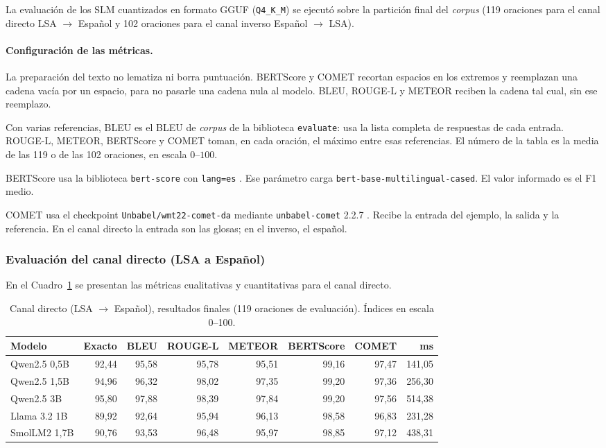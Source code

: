 La evaluación de los SLM cuantizados en formato GGUF (\texttt{Q4\_K\_M}) se ejecutó sobre la partición final del \textit{corpus} (119 oraciones para el canal directo LSA $\rightarrow$ Español y 102 oraciones para el canal inverso Español $\rightarrow$ LSA).

\paragraph{Configuración de las métricas.}
La preparación del texto no lematiza ni borra puntuación. BERTScore y COMET recortan espacios en los extremos y reemplazan una cadena vacía por un espacio, para no pasarle una cadena nula al modelo. BLEU, ROUGE-L y METEOR reciben la cadena tal cual, sin ese reemplazo.

Con varias referencias, BLEU es el BLEU de \textit{corpus} de la biblioteca \texttt{evaluate}: usa la lista completa de respuestas de cada entrada. ROUGE-L, METEOR, BERTScore y COMET toman, en cada oración, el máximo entre esas referencias. El número de la tabla es la media de las 119 o de las 102 oraciones, en escala $0$--$100$.

BERTScore usa la biblioteca \texttt{bert-score} con \texttt{lang=es} \parencite{zhang2020bertscore}. Ese parámetro carga \texttt{bert-base-multilingual-cased}. El valor informado es el F1 medio.

COMET usa el checkpoint \texttt{Unbabel/wmt22-comet-da} mediante \texttt{unbabel-comet} 2.2.7 \parencite{rei2020comet}. Recibe la entrada del ejemplo, la salida y la referencia. En el canal directo la entrada son las glosas; en el inverso, el español.

\subsubsection{Evaluación del canal directo (LSA a Español)}
En el Cuadro~\ref{tab:sem_directo} se presentan las métricas cualitativas y cuantitativas para el canal directo.

\begin{table}[H]
\centering
\footnotesize
\setlength{\tabcolsep}{3.5pt}
\caption{Canal directo (LSA $\rightarrow$ Español), resultados finales (119 oraciones de evaluación). Índices en escala 0--100.}
\label{tab:sem_directo}
\begin{tabular}{@{}lrrrrrrr@{}}
\toprule
\textbf{Modelo} & \textbf{Exacto} & \textbf{BLEU} & \textbf{ROUGE-L} & \textbf{METEOR} & \textbf{BERTScore} & \textbf{COMET} & \textbf{ms} \\
\midrule
Qwen2.5 0,5B & 92,44 & 95,58 & 95,78 & 95,51 & 99,16 & 97,47 & 141,05 \\
Qwen2.5 1,5B & 94,96 & 96,32 & 98,02 & 97,35 & 99,20 & 97,36 & 256,30 \\
Qwen2.5 3B   & 95,80 & 97,88 & 98,39 & 97,84 & 99,20 & 97,56 & 514,38 \\
Llama 3.2 1B & 89,92 & 92,64 & 95,94 & 96,13 & 98,58 & 96,83 & 231,28 \\
SmolLM2 1,7B & 90,76 & 93,53 & 96,48 & 95,97 & 98,85 & 97,12 & 438,31 \\
\bottomrule
\end{tabular}
\end{table}

